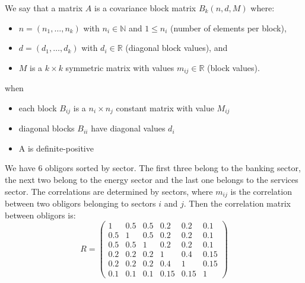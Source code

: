 \documentclass[11pt,fleqn]{book} %
\begin{document}
\begin{definition}
We say that a matrix $A$ is a covariance block matrix $B_k(n,d,M)$ where:
\begin{itemize}
\item $n=(n_1,\dots,n_k)$ with $n_i \in \mathbb{N}$ and $1 \le n_i$ (number of elements per block),
\item $d=(d_1,\dots,d_k)$ with $d_i \in \mathbb{R}$ (diagonal block values), and
\item $M$ is a $k \times k$ symmetric matrix with values $m_{ij} \in \mathbb{R}$ (block values).
\end{itemize}
when
\begin{itemize}
\item each block $B_{ij}$ is a $n_i \times n_j$ constant matrix with value $M_{ij}$
\item diagonal blocks $B_{ii}$ have diagonal values $d_i$
\item A is definite-positive
\end{itemize}
\end{definition}

\begin{example}
\label{example1}
We have $6$ obligors sorted by sector. The first three belong to the 
banking sector, the next two belong to the energy sector 
and the last one belongs to the services sector. The correlations are 
determined by sectors, where $m_{ij}$ is the correlation between two 
obligors belonging to sectors $i$ and $j$. Then the correlation matrix 
between obligors is:
\begin{displaymath}
R=
\left(
\begin{array}{ccc|cc|c} 
1   & 0.5 & 0.5 & 0.2  & 0.2  & 0.1 \\ 
0.5 & 1   & 0.5 & 0.2  & 0.2  & 0.1 \\ 
0.5 & 0.5 & 1   & 0.2  & 0.2  & 0.1 \\ 
\hline
0.2 & 0.2 & 0.2 & 1    & 0.4  & 0.15 \\ 
0.2 & 0.2 & 0.2 & 0.4  & 1    & 0.15 \\ 
\hline
0.1 & 0.1 & 0.1 & 0.15 & 0.15 & 1
\end{array} 
\right)
\end{displaymath}
\end{example}
\end{document}
